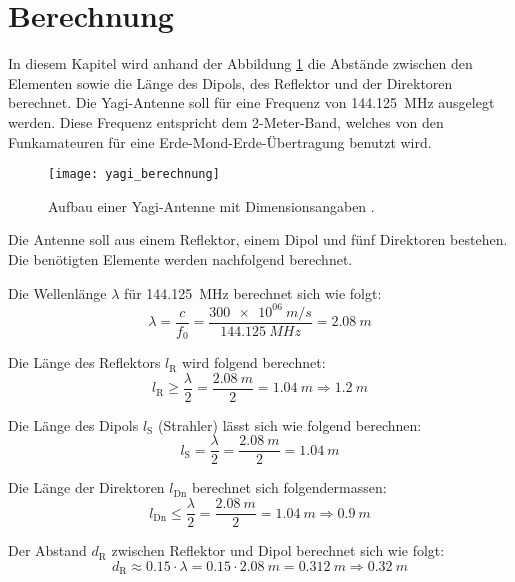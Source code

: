\section{Berechnung}\label{sec:Berechnung}
In diesem Kapitel wird anhand der Abbildung \ref{fig:berechnung} die Abstände zwischen den Elementen sowie die Länge des Dipols, des Reflektor und der Direktoren berechnet. Die Yagi-Antenne soll für eine Frequenz von \SI{144.125}{MHz} ausgelegt werden. Diese Frequenz entspricht dem 2-Meter-Band, welches von den Funkamateuren für eine Erde-Mond-Erde-Übertragung benutzt wird.

\begin{figure}[H]
	\centering
	\texttt{[image: yagi\_berechnung]}
	\caption{Aufbau einer Yagi-Antenne mit Dimensionsangaben \cite{script}.}\label{fig:berechnung}
\end{figure}

Die Antenne soll aus einem Reflektor, einem Dipol und fünf Direktoren bestehen. Die benötigten Elemente werden nachfolgend berechnet.

Die Wellenlänge $ \lambda $ für \SI{144.125}{MHz} berechnet sich wie folgt:
\begin{equation}
\lambda=\frac{c}{f_{0}}=\frac{\SI{300e06}{m/s}}{
\SI{144.125}{MHz}} = \SI{2.08}{m}
\end{equation}

Die Länge des Reflektors $ l_\mathrm{R} $ wird folgend berechnet:
\begin{equation}
l_\mathrm{R}\geq\frac{\lambda}{2}=\frac{\SI{2.08}{m}}{
	2} = \SI{1.04}{m} \Rightarrow \SI{1.2}{m}
\end{equation}

Die Länge des Dipols $ l_\mathrm{S} $ (Strahler) lässt sich wie folgend berechnen:
\begin{equation}
l_\mathrm{S}=\frac{\lambda}{2}=\frac{\SI{2.08}{m}}{
	2} = \SI{1.04}{m}
\end{equation}

Die Länge der Direktoren $ l_\mathrm{Dn} $ berechnet sich folgendermassen:
\begin{equation}
l_\mathrm{Dn}\leq\frac{\lambda}{2}=\frac{\SI{2.08}{m}}{
	2} = \SI{1.04}{m} \Rightarrow \SI{0.9}{m}
\end{equation}

Der Abstand $ d_\mathrm{R} $ zwischen Reflektor und Dipol berechnet sich wie folgt:
\begin{equation}
d_\mathrm{R}\approx 0.15\cdot\lambda=0.15\cdot \SI{2.08}{m}= \SI{0.312}{m}\Rightarrow \SI{0.32}{m}
\end{equation}

